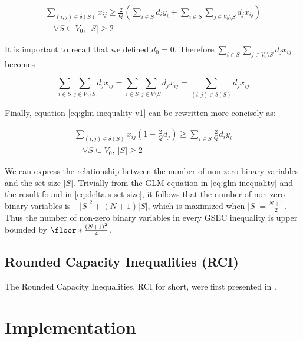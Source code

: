\begin{equation}\label{eq:glm-inequality-v1}
	\begin{split}
		\sum_{(i, j) \in \delta(S)} x_{ij} \ge \frac{2}{Q} \left(  \sum_{i \in S} d_i y_i + \sum_{i \in S} \sum_{j \in V_0 \setminus S} d_j  x_{ij}\right) \\ \quad \forall S \subseteq V_0,\ |S| \ge 2
	\end{split}
\end{equation}

It is important to recall that we defined $d_0 = 0$.
Therefore $\sum_{i \in S} \sum_{j \in V_0 \setminus S} d_j  x_{ij}$ becomes

\begin{equation}
	\sum_{i \in S} \sum_{j \in V_0 \setminus S} d_j  x_{ij} = \sum_{i \in S} \sum_{j \in V \setminus S} d_j  x_{ij} = \sum_{(i, j) \in \delta(S)} d_j x_{ij}
\end{equation}

Finally, equation \eqref{eq:glm-inequality-v1} can be rewritten more concisely as:

\begin{equation}\label{eq:glm-inequality}
	\begin{split}
		\sum_{(i, j) \in \delta(S)} x_{ij} \left( 1 - \frac{2}{Q} d_j \right)    \ge \sum_{i \in S} \frac{2}{Q} d_i y_i  \\ \quad \forall S \subseteq V_0,\ |S| \ge 2
	\end{split}
\end{equation}


We can express the relationship between the number of non-zero binary variables and the set size $|S|$.
Trivially from the GLM equation in \eqref{eq:glm-inequality} and the result found in \eqref{eq:delta-s-set-size}, it follows that the number of non-zero binary variables is $-|S|^2 + (N + 1)|S|$, which is maximized when $|S| = \frac{N+1}{2}$.
Thus the number of non-zero binary variables in every GSEC inequality is upper bounded by $\floor*{ \frac{\left( N + 1 \right)^2}{4}}$.


\subsection{Rounded Capacity Inequalities (RCI)}
The Rounded Capacity Inequalities, RCI for short, were first presented in \cite{achuthan_capacitated_1998}.

\section{Implementation}

